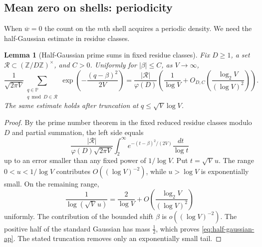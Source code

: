 \documentclass[11pt,reqno]{amsart}
\theoremstyle{plain}
\newtheorem{lemma}[theorem]{Lemma}
\theoremstyle{definition}
\newcommand{\Z}{\mathbb{Z}}
\newcommand{\Pp}{\mathbb{P}}
\newcommand{\1}{\mathbf 1}
\begin{document}
\subsection{Mean zero on shells: periodicity}

When $\overline w=0$ the count on the $m$th shell acquires a periodic density.  We need the half-Gaussian estimate in residue classes.

\begin{lemma}[Half-Gaussian prime sums in fixed residue classes]\label{lem:half-gaussian-ap}
Fix $D\ge1$, a set $\mathcal R\subset(\Z/D\Z)^\times$, and $C>0$.  Uniformly for $|\beta|\le C$, as $V\to\infty$,
\begin{equation}\label{eq:half-gaussian-ap}
 \frac1{\sqrt{2\pi V}}
 \sum_{\substack{q\in\Pp\\q\bmod D\in\mathcal R}}
 \exp\left(-\frac{(q-\beta)^2}{2V}\right)
 =\frac{|\mathcal R|}{\varphi(D)}
 \left(\frac1{\log V}+O_{D,C}\left(\frac{\log_2V}{(\log V)^2}\right)\right).
\end{equation}
The same estimate holds after truncation at $q\le\sqrt V\log V$.
\end{lemma}

\begin{proof}
By the prime number theorem in the fixed reduced residue classes modulo $D$ and partial summation, the left side equals
\[
 \frac{|\mathcal R|}{\varphi(D)\sqrt{2\pi V}}
 \int_2^\infty e^{-(t-\beta)^2/(2V)}\frac{dt}{\log t}
\]
up to an error smaller than any fixed power of $1/\log V$.  Put $t=\sqrt V\,u$.  The range $0<u<1/\log V$ contributes $O((\log V)^{-2})$, while $u>\log V$ is exponentially small.  On the remaining range,
\[
 \frac1{\log(\sqrt V\,u)}
 =\frac2{\log V}+O\left(\frac{\log_2V}{(\log V)^2}\right)
\]
uniformly.  The contribution of the bounded shift $\beta$ is $o((\log V)^{-2})$.  The positive half of the standard Gaussian has mass $\tfrac12$, which proves \eqref{eq:half-gaussian-ap}.  The stated truncation removes only an exponentially small tail.
\end{proof}
\end{document}
